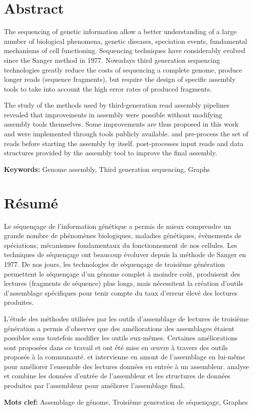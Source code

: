 \documentclass[main.tex]{subfiles}
\begin{document}
\pagestyle{empty}

\section*{Abstract}

The sequencing of genetic information allow a better understanding of a large number of biological phenomena, genetic diseases, speciation events, fundamental mechanisms of cell functioning. Sequencing techniques have considerably evolved since the Sanger method in 1977. Nowadays third generation sequencing technologies greatly reduce the costs of sequencing a complete genome, produce longer reads (sequence fragments), but require the design of specific assembly tools to take into account the high error rates of produced fragments.

The study of the methods used by third-generation read assembly pipelines revealed that improvements in assembly were possible without modifying assembly tools themselves. Some improvements are thus proposed in this work and were implemented through tools publicly available. \yacrd and \fpa pre-process the set of reads before starting the assembly by itself. \knot post-processes input reads and data structures provided by the assembly tool to improve the final assembly.

\textbf{Keywords:} Genome assembly, Third generation sequencing, Graphs

\section*{Résumé}

Le séquençage de l'information génétique a permis de mieux comprendre un grande nombre de phénomènes biologiques, maladies génétiques, évènements de spéciations, mécanismes fondamentaux du fonctionnement de nos cellules. Les techniques de séquençage ont beaucoup évoluver depuis la méthode de Sanger en 1977. De nos jours, les technologies de séquençage de troisième génération permettent le séquençage d'un génome complet à moindre coût, produisent des lectures (fragments de séquence) plus longs, mais nécessitent la création d'outils d'assemblage spécifiques pour tenir compte du taux d'erreur élevé des lectures produites.

L'étude des méthodes utilisées par les outils d'assemblage de lectures de troisième génération a permis d'observer que des améliorations des assemblages étaient possibles sans toutefois modifier les outils eux-mêmes. Certaines améliorations sont proposées dans ce travail et ont été mise en œuvre à travers des outils proposés à la communauté. \yacrd et \fpa  intervienne en amont de l'assemblage en lui-même pour améliorer l'ensemble des lectures données en entrée à un assembleur. \knot analyse et combine les données d'entrée de l'assembleur et les structures de données produites par l'assembleur pour améliorer l'assemblage final.

\textbf{Mots clef:} Assemblage de génome, Troisième generation de séquençage, Graphes
\end{document}
